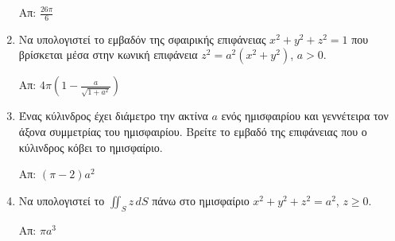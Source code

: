 \documentclass[a4paper,table]{report}
\begin{document}
\begin{enumerate}
\hfill Απ: $\frac{26\pi}{6}$

\item Να υπολογιστεί το εμβαδόν της σφαιρικής επιφάνειας $x^{2}+y^{2}+z^{2}=1$ που βρίσκεται μέσα στην κωνική επιφάνεια $z^{2}=a^{2}(x^{2}+y^{2})$, $a>0$.

\hfill Απ: $4\pi\left(1-\frac{a}{\sqrt{1+a^{2}}}\right)$

\item Ένας κύλινδρος έχει διάμετρο την ακτίνα $a$ ενός ημισφαιρίου και γεννέτειρα τον άξονα συμμετρίας του ημισφαιρίου. Βρείτε το εμβαδό της επιφάνειας που ο κύλινδρος κόβει το ημισφαίριο.

\hfill Απ: $(\pi-2)a^{2}$

\item Να υπολογιστεί το $\iint_{S}z\,dS$ πάνω στο ημισφαίριο $x^{2}+y^{2}+z^{2}=a^{2}$, $z\geq 0$.

\hfill Απ: $\pi a^{3}$

\end{enumerate}
\end{document}
